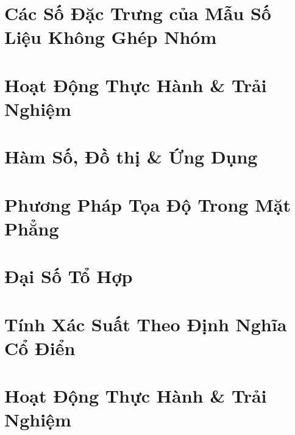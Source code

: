 \documentclass{article}
\numberwithin{equation}{section}
\begin{document}

\section{Các Số Đặc Trưng của Mẫu Số Liệu Không Ghép Nhóm}


\section*{Hoạt Động Thực Hành \& Trải Nghiệm}


\section{Hàm Số, Đồ thị \& Ứng Dụng}
\cite{Khoai_Anh_Tan_Thang_Anh_Cuong_Duong_Dang_Ha_Hanh_Hong_Son_Tuan_Vuong_Toan_10_tap_2}


\section{Phương Pháp Tọa Độ Trong Mặt Phẳng}


\section{Đại Số Tổ Hợp}


\section{Tính Xác Suất Theo Định Nghĩa Cổ Điển}


\section*{Hoạt Động Thực Hành \& Trải Nghiệm}
\end{document}
